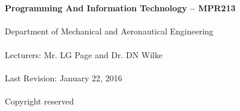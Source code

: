 \begin{titlepage}
    \thispagestyle{empty}
    \\~\\[18cm]
    \large
    \textbf{Programming And Information Technology -- MPR213} \\~\\
    Department of Mechanical and Aeronautical Engineering \\~\\[0.5cm]
    \normalsize
    Lecturers: Mr. LG Page and  Dr. DN Wilke \\~\\
    Last Revision: January 22, 2016 \\~\\[0.5em]
    \textcopyright \quad Copyright reserved \\~\\
\end{titlepage}
\restoregeometry
